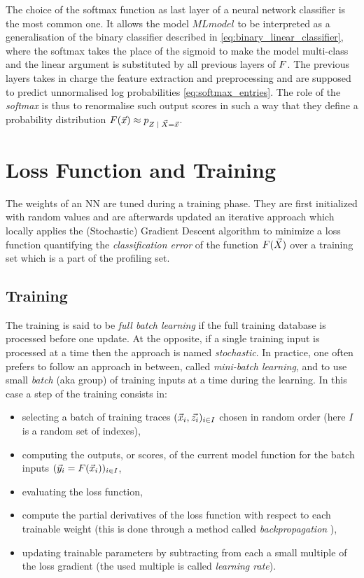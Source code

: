 The choice of the softmax function as last layer of a neural network classifier is the most common one. It allows the model $MLmodel$ to be interpreted as a generalisation of the binary classifier described in \eqref{eq:binary_linear_classifier}, where the softmax takes the place of the sigmoid to make the model multi-class and the linear argument is substituted by all previous layers of $F$. The previous layers takes in charge the feature extraction and preprocessing and are supposed to predict unnormalised log probabilities \eqref{eq:softmax_entries}. The role of the \emph{softmax} is thus to renormalise such output scores in such a way that they define a probability distribution $\MLmodel(\vLeakVec) \approx \pdf_{\given{\sensRandVar}{\vaLeakVec=\vLeakVec}}$. 

\section{Loss Function and Training}
The weights of an NN are tuned during a training phase. They are first initialized with random values and are afterwards updated  \via an
iterative approach which locally applies the (Stochastic) Gradient Descent
algorithm \cite{Goodfellow-et-al-2016} to minimize a loss function
quantifying the \emph{classification error} of the function
$F(\vec{X})$ over a training set which is a part of the profiling set. 


\subsection{Training}
The training is said to be \emph{full batch learning} if
the full training database is processed before one update. At the opposite, if
a single training input is processed at a time then the approach is named
\emph{stochastic}. In practice, one often prefers to follow an approach in
between, called \emph{mini-batch learning}, and to use small \emph{batch} (aka
group) of training inputs at a time during the learning. In this case a step of the training consists in: 
\begin{itemize}
\item selecting a batch of training traces $(\vec{x}_i, \vec{z_i})_{i\in I}$ chosen in random order (here $I$ is a random set of indexes),
\item computing the outputs, or scores, of the current model function for the batch inputs $(\vec{y}_i = F(\vec{x}_i))_{i\in I}$, 
\item evaluating the loss function,
\item compute the partial derivatives of the loss function with respect to each trainable weight (this is done through a method called \emph{backpropagation} \cite{LeCun2012}),
\item updating trainable parameters by subtracting from each a small multiple of the loss gradient (the used multiple is called \emph{learning rate}).
\end{itemize}  

